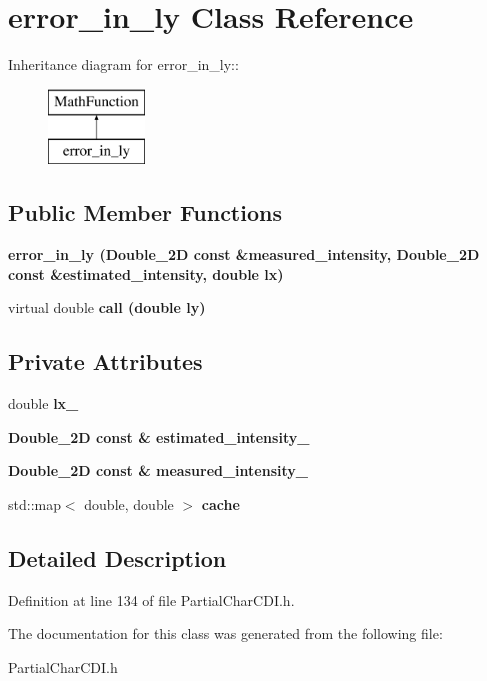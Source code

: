 \section{error\_\-in\_\-ly Class Reference}
\label{classerror__in__ly}
Inheritance diagram for error\_\-in\_\-ly::\begin{figure}[H]
\begin{center}
\leavevmode
\includegraphics[height=2cm]{classerror__in__ly}
\end{center}
\end{figure}
\subsection*{Public Member Functions}
\begin{CompactItemize}
\item 
\bf{error\_\-in\_\-ly} (\bf{Double\_\-2D} const \&measured\_\-intensity, \bf{Double\_\-2D} const \&estimated\_\-intensity, double lx)\label{classerror__in__ly_b9d144e2ab980a50cf82b3cacf3db0a5}

\item 
virtual double \bf{call} (double ly)\label{classerror__in__ly_5e3f411654bc1b993a65d5a4f43f0d6d}

\end{CompactItemize}
\subsection*{Private Attributes}
\begin{CompactItemize}
\item 
double \bf{lx\_\-}\label{classerror__in__ly_b412dfc08acb49d01a49b2e5b9812b69}

\item 
\bf{Double\_\-2D} const \& \bf{estimated\_\-intensity\_\-}\label{classerror__in__ly_85bdc0e073e46d3f7497b06951747715}

\item 
\bf{Double\_\-2D} const \& \bf{measured\_\-intensity\_\-}\label{classerror__in__ly_0a61fa8b39c2c1fa63e01ab8b876d533}

\item 
std::map$<$ double, double $>$ \bf{cache}\label{classerror__in__ly_31198834676c694a170da5652c401d5d}

\end{CompactItemize}


\subsection{Detailed Description}




Definition at line 134 of file Partial\-Char\-CDI.h.

The documentation for this class was generated from the following file:\begin{CompactItemize}
\item 
Partial\-Char\-CDI.h\end{CompactItemize}
